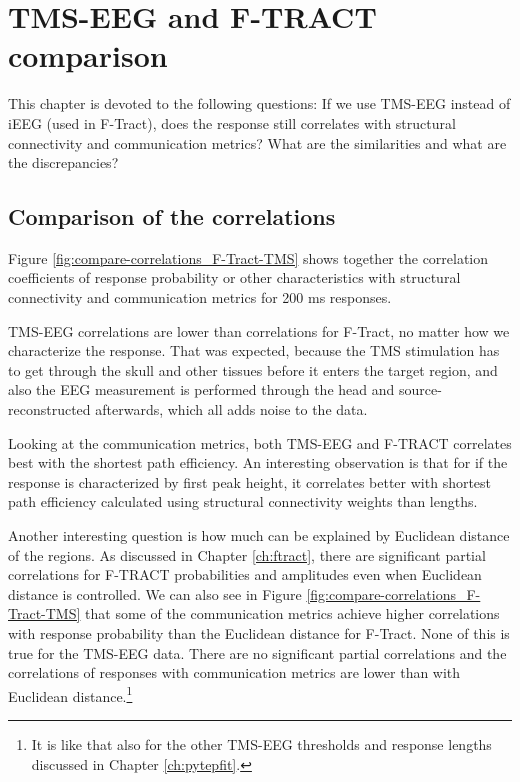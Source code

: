 \chapter{TMS-EEG and F-TRACT comparison}\label{ch:compare}

This chapter is devoted to the following questions: If we use TMS-EEG instead of iEEG (used in F-Tract), does the response still correlates with structural connectivity and communication metrics?  What are the similarities and what are the discrepancies? 

\section{Comparison of the correlations}\label{sec:compare-correlations_F-Tract-TMS}

Figure \ref{fig:compare-correlations_F-Tract-TMS} shows together the correlation coefficients of response probability or other characteristics with structural connectivity and communication metrics for 200 ms responses. 

TMS-EEG correlations are lower than correlations for F-Tract, no matter how we characterize the response. That was expected, because the TMS stimulation has to get through the skull and other tissues before it enters the target region, and also the EEG measurement is performed through the head and source-reconstructed afterwards, which all adds noise to the data.

Looking at the communication metrics, both TMS-EEG and F-TRACT correlates best with the shortest path efficiency. An interesting observation is that for if the response is characterized by first peak height, it correlates better with shortest path efficiency calculated using structural connectivity weights than lengths.

Another interesting question is how much can be explained by Euclidean distance of the regions. As discussed in Chapter \ref{ch:ftract}, there are significant partial correlations for F-TRACT probabilities and amplitudes even when Euclidean distance is controlled. We can also see in Figure \ref{fig:compare-correlations_F-Tract-TMS} that some of the communication metrics achieve higher correlations with response probability than the Euclidean distance for F-Tract. None of this is true for the TMS-EEG data. There are no significant partial correlations and the correlations of responses with communication metrics are lower than with Euclidean distance.\footnote{It is like that also for the other TMS-EEG thresholds and response lengths discussed in Chapter \ref{ch:pytepfit}.} 


